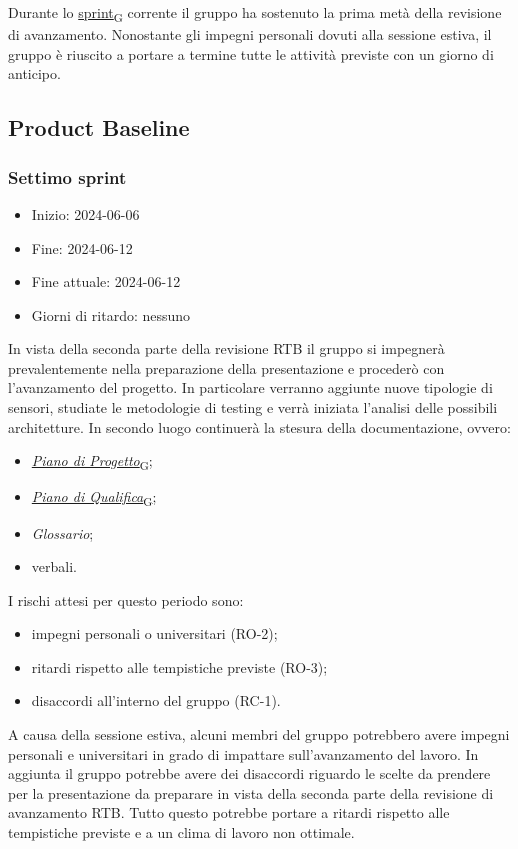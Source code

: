 Durante lo \href{https://7last.github.io/docs/pb/documentazione-interna/glossario\#sprint}{sprint\textsubscript{G}} corrente il gruppo ha sostenuto la prima metà della revisione di avanzamento. Nonostante gli impegni personali dovuti alla sessione estiva, il gruppo è riuscito a portare a termine tutte le attività previste con un giorno di anticipo.



\newpage
\subsection{Product Baseline}
\subsubsection{Settimo sprint}
\begin{itemize}
	\item Inizio: 2024-06-06
	\item Fine: 2024-06-12
	\item Fine attuale: 2024-06-12
	\item Giorni di ritardo: nessuno
\end{itemize}

In vista della seconda parte della revisione RTB il gruppo si impegnerà prevalentemente nella preparazione della presentazione e procederò con l'avanzamento del progetto. In particolare verranno aggiunte nuove tipologie di sensori, studiate le metodologie di testing e verrà iniziata l'analisi delle possibili architetture. In secondo luogo continuerà la stesura della documentazione, ovvero:
\begin{itemize}
	\item \href{https://7last.github.io/docs/pb/documentazione-interna/glossario\#piano-di-progetto}{\textit{Piano di Progetto}\textsubscript{G}};
	\item \href{https://7last.github.io/docs/pb/documentazione-interna/glossario\#piano-di-qualifica}{\textit{Piano di Qualifica}\textsubscript{G}};
	\item \textit{Glossario};
	\item verbali.
\end{itemize}

I rischi attesi per questo periodo sono:
\begin{itemize}
	\item impegni personali o universitari (RO-2);
	\item ritardi rispetto alle tempistiche previste (RO-3);
	\item disaccordi all'interno del gruppo (RC-1).
\end{itemize}
A causa della sessione estiva, alcuni membri del gruppo potrebbero avere impegni personali e universitari in grado di impattare sull'avanzamento del lavoro. In aggiunta il gruppo potrebbe avere dei disaccordi riguardo le scelte da prendere per la presentazione da preparare in vista della seconda parte della revisione di avanzamento RTB. Tutto questo potrebbe portare a ritardi rispetto alle tempistiche previste e a un clima di lavoro non ottimale.

